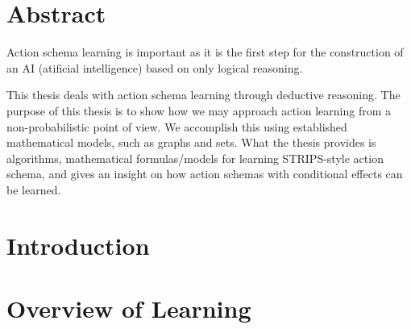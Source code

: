 \documentclass[10pt,twoside]{book}                  %
\theoremstyle{definition}
\theoremstyle{plain}
\begin{document}
\prefrontmatter
\frontmatter
{}     
\chapter{Abstract}
 
Action schema learning is important as it is the first step for the construction of an AI (atificial intelligence) based on only logical reasoning. 

This thesis deals with action schema learning through deductive reasoning.
The purpose of this thesis is to show how we may approach action learning from a non-probabilistic point of view. 
We accomplish this using established mathematical models, such as graphs and sets. 
What the thesis provides is algorithms, mathematical formulas/models for learning STRIPS-style action schema, and gives an insight on how action schemas with conditional effects can be learned.



\markboth{}{}                                       %
\markboth{}{}                                       %
\markboth{}{}                                       %
\markboth{}{}                                       %
\newpage\mbox{}\newpage
{}
\renewcommand{\sectionmark}[1]{\markright{#1}}
\sectionmark{Contents}
\addtolength{\parskip}{-\baselineskip}
\tableofcontents
\listofalgorithms
\addtolength{\parskip}{\baselineskip}
\renewcommand{\sectionmark}[1]{\markright{\thesection\ #1}}

\mainmatter
\chapter{Introduction}
	

\chapter{Overview of Learning}\label{sec:Learning}
    
\end{document}
